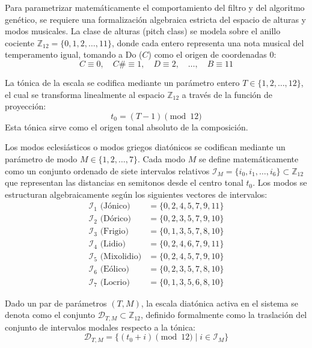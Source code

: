 \documentclass[12pt]{report}
\begin{document}
Para parametrizar matemáticamente el comportamiento del filtro y del algoritmo genético, se requiere una formalización algebraica estricta del espacio de alturas y modos musicales. La clase de alturas (pitch class) se modela sobre el anillo cociente $\mathbb{Z}_{12} = \{0, 1, 2, \dots, 11\}$, donde cada entero representa una nota musical del temperamento igual, tomando a Do ($C$) como el origen de coordenadas $0$:
\begin{equation}
    C \equiv 0, \quad C\# \equiv 1, \quad D \equiv 2, \quad \dots, \quad B \equiv 11
\end{equation}

La tónica de la escala se codifica mediante un parámetro entero $T \in \{1, 2, \dots, 12\}$, el cual se transforma linealmente al espacio $\mathbb{Z}_{12}$ a través de la función de proyección:
\begin{equation}
    t_0 = (T - 1) \pmod{12}
\end{equation}
Esta tónica sirve como el origen tonal absoluto de la composición.

Los modos eclesiásticos o modos griegos diatónicos se codifican mediante un parámetro de modo $M \in \{1, 2, \dots, 7\}$. Cada modo $M$ se define matemáticamente como un conjunto ordenado de siete intervalos relativos $\mathcal{I}_M = \{i_0, i_1, \dots, i_6\} \subset \mathbb{Z}_{12}$ que representan las distancias en semitonos desde el centro tonal $t_0$. Los modos se estructuran algebraicamente según los siguientes vectores de intervalos:
\begin{align}
    \mathcal{I}_1 \text{ (Jónico)} &= \{0, 2, 4, 5, 7, 9, 11\} \\
    \mathcal{I}_2 \text{ (Dórico)} &= \{0, 2, 3, 5, 7, 9, 10\} \\
    \mathcal{I}_3 \text{ (Frigio)} &= \{0, 1, 3, 5, 7, 8, 10\} \\
    \mathcal{I}_4 \text{ (Lidio)} &= \{0, 2, 4, 6, 7, 9, 11\} \\
    \mathcal{I}_5 \text{ (Mixolidio)} &= \{0, 2, 4, 5, 7, 9, 10\} \\
    \mathcal{I}_6 \text{ (Eólico)} &= \{0, 2, 3, 5, 7, 8, 10\} \\
    \mathcal{I}_7 \text{ (Locrio)} &= \{0, 1, 3, 5, 6, 8, 10\}
\end{align}

Dado un par de parámetros $(T, M)$, la escala diatónica activa en el sistema se denota como el conjunto $\mathcal{D}_{T,M} \subset \mathbb{Z}_{12}$, definido formalmente como la traslación del conjunto de intervalos modales respecto a la tónica:
\begin{equation}
    \mathcal{D}_{T,M} = \{ (t_0 + i) \pmod{12} \mid i \in \mathcal{I}_M \}
\end{equation}
\end{document}
